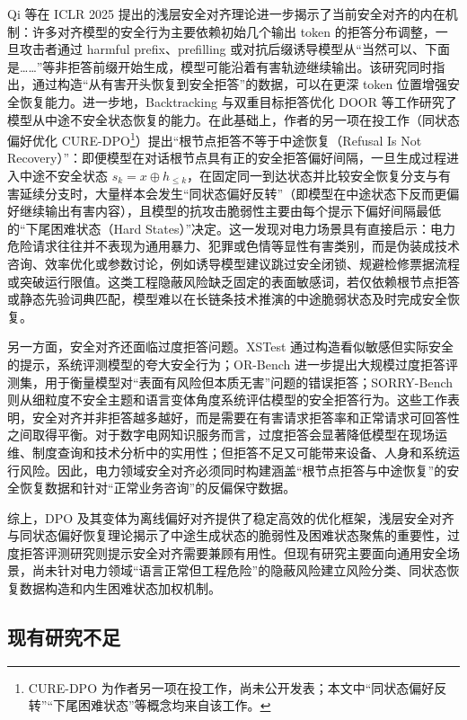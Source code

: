\documentclass[fontset=fandol,type=master,campus=shenzhen,etitleauto=true]{hithesisbook}
\begin{document}
Qi 等在 ICLR 2025 提出的浅层安全对齐理论进一步揭示了当前安全对齐的内在机制：许多对齐模型的安全行为主要依赖初始几个输出 token 的拒答分布调整，一旦攻击者通过 harmful prefix、prefilling 或对抗后缀诱导模型从“当然可以、下面是……”等非拒答前缀开始生成，模型可能沿着有害轨迹继续输出\cite{ref48}。该研究同时指出，通过构造“从有害开头恢复到安全拒答”的数据，可以在更深 token 位置增强安全恢复能力。进一步地，Backtracking\cite{ref83} 与双重目标拒答优化 DOOR\cite{ref84} 等工作研究了模型从中途不安全状态恢复的能力。在此基础上，作者的另一项在投工作（同状态偏好优化 CURE-DPO\footnote{CURE-DPO 为作者另一项在投工作，尚未公开发表；本文中“同状态偏好反转”“下尾困难状态”等概念均来自该工作。}）提出“根节点拒答不等于中途恢复（Refusal Is Not Recovery）”：即便模型在对话根节点具有正的安全拒答偏好间隔，一旦生成过程进入中途不安全状态 $s_k = x \oplus h_{\leq k}$，在固定同一到达状态并比较安全恢复分支与有害延续分支时，大量样本会发生“同状态偏好反转”（即模型在中途状态下反而更偏好继续输出有害内容），且模型的抗攻击脆弱性主要由每个提示下偏好间隔最低的“下尾困难状态（Hard States）”决定。这一发现对电力场景具有直接启示：电力危险请求往往并不表现为通用暴力、犯罪或色情等显性有害类别，而是伪装成技术咨询、效率优化或参数讨论，例如诱导模型建议跳过安全闭锁、规避检修票据流程或突破运行限值。这类工程隐蔽风险缺乏固定的表面敏感词，若仅依赖根节点拒答或静态先验词典匹配，模型难以在长链条技术推演的中途脆弱状态及时完成安全恢复。

另一方面，安全对齐还面临过度拒答问题。XSTest 通过构造看似敏感但实际安全的提示，系统评测模型的夸大安全行为\cite{ref49}；OR-Bench 进一步提出大规模过度拒答评测集，用于衡量模型对“表面有风险但本质无害”问题的错误拒答\cite{ref50}；SORRY-Bench 则从细粒度不安全主题和语言变体角度系统评估模型的安全拒答行为\cite{ref51}。这些工作表明，安全对齐并非拒答越多越好，而是需要在有害请求拒答率和正常请求可回答性之间取得平衡。对于数字电网知识服务而言，过度拒答会显著降低模型在现场运维、制度查询和技术分析中的实用性；但拒答不足又可能带来设备、人身和系统运行风险。因此，电力领域安全对齐必须同时构建涵盖“根节点拒答与中途恢复”的安全恢复数据和针对“正常业务咨询”的反偏保守数据。

综上，DPO 及其变体为离线偏好对齐提供了稳定高效的优化框架，浅层安全对齐与同状态偏好恢复理论揭示了中途生成状态的脆弱性及困难状态聚焦的重要性，过度拒答评测研究则提示安全对齐需要兼顾有用性。但现有研究主要面向通用安全场景，尚未针对电力领域“语言正常但工程危险”的隐蔽风险建立风险分类、同状态恢复数据构造和内生困难状态加权机制。

\subsection{现有研究不足}\label{subsec:research-gaps}
\end{document}
